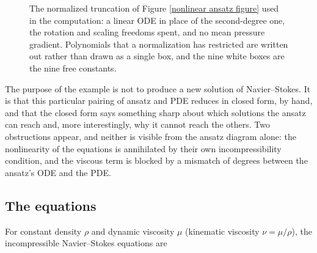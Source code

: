 \documentclass{article}
\theoremstyle{definition}
\theoremstyle{plain}
\newcommand{\tikzmark}[1]{\tikz[overlay,remember picture] \node (#1) {};}
\newcommand{\markedcoeff}[1]{\framebox(10,10){}\tikzmark{#1}\,}
\begin{document}
\begin{nsexample}
\begin{figure}[H]
{\begin{minipage}{\dimexpr\textwidth-2\fboxsep-2\fboxrule-7pt}
{
}
\end{minipage}%
}
\caption{The normalized truncation of Figure \ref{nonlinear ansatz figure}
used in the computation: a linear ODE in place of the second-degree one, the
rotation and scaling freedoms spent, and no mean pressure gradient.  Polynomials
that a normalization has restricted are written out rather than drawn as a
single box, and the nine white boxes are the nine free constants.}
\label{normalized ansatz figure}
\end{figure}

The purpose of the example is not to produce a new solution of Navier--Stokes.
It is that this particular pairing of ansatz and PDE reduces in closed form,
by hand, and that the closed form says something sharp about which solutions
the ansatz can reach and, more interestingly, why it cannot reach the others.
Two obstructions appear, and neither is visible from the ansatz diagram alone:
the nonlinearity of the equations is annihilated by their own incompressibility
condition, and the viscous term is blocked by a mismatch of degrees between
the ansatz's ODE and the PDE.

\subsection{The equations}

For constant density $\rho$ and dynamic viscosity $\mu$ (kinematic viscosity
$\nu = \mu/\rho$), the incompressible Navier--Stokes equations are


\end{nsexample}
\end{document}
